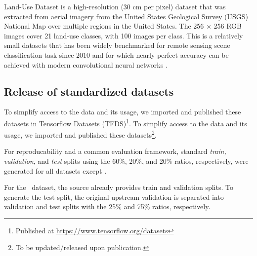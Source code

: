{\bf \ucm{}} Land-Use Dataset \citep{yang2010:ucmerced} is a high-resolution (30 cm per pixel) dataset that was extracted from aerial imagery from the United States Geological Survey (USGS) National Map over multiple regions in the United States.
The 256 $\times$ 256 RGB images cover 21 land-use classes, with  100 images per class. 
This is a relatively small datasets that has been widely benchmarked for remote sensing scene classification task since 2010 and for which nearly perfect accuracy can be achieved with modern convolutional neural networks \citep{castelluccio2015, marmanis2016, nogueira2016:cnn}.





\subsection{Release of standardized datasets}




\iffinal
To simplify access to the data and its usage, we imported and published these datasets in 
Tensorflow Datasets (TFDS)\footnote{Published at \url{https://www.tensorflow.org/datasets}}.
\else
To simplify access to the data and its usage, we imported and published these datasets\footnote{To be updated/released upon publication.}.
\fi



For reproducability and a common evaluation framework, standard \emph{train, validation}, and \emph{test} splits using the 60\%, 20\%, and 20\% ratios, respectively, were generated for all datasets except \sos.

For the \sos\ dataset, the source already provides train and validation splits. To generate the test split, the original upstream validation is separated into validation and test splits with the 25\% and 75\% ratios, respectively.














